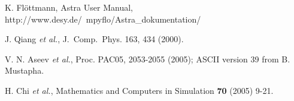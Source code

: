 \documentclass[11pt]{article}
\begin{document}
\begin{thebibliography}{9}
  K. Fl\"{o}ttmann, Astra User Manual, http://www.desy.de/~mpyflo/Astra\_dokumentation/

J. Qiang {\em et al.},  J.~Comp.~Phys. 163, 434 (2000).

  V. N. Aseev {\em et al.}, Proc. PAC05, 2053-2055 (2005); ASCII version 39 from B. Mustapha.

  H. Chi {\em et al.}, Mathematics and Computers in Simulation {\bf 70} (2005) 9-21.

\end{thebibliography}
\end{document}
